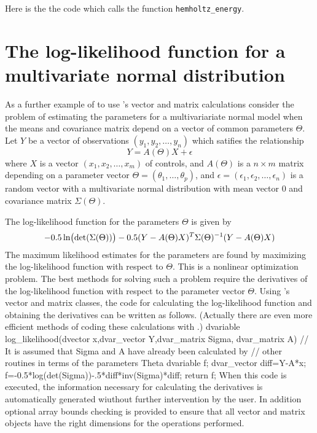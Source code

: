 \documentclass[12pt]{book}
\begin{document}
\goodbreak
Here is the the code which calls the function {\tt hemholtz\_energy}. 
\bigskip
{}

\section{The log-likelihood function for a multivariate normal distribution}
As a further example of to use \AD's vector and matrix
calculations consider the problem of estimating
the parameters for a multivariariate normal model
when the means and covariance matrix depend on a vector
of common parameters $\Theta$.
Let $Y$ be a vector of observations $(y_1, y_2,\ldots,y_n)$
which satifies the relationship
$$ Y = A(\Theta)X + \epsilon $$
where 
$X$ is a vector $(x_1, x_2,\ldots,x_m)$ of controls,
and $A(\Theta)$ is a $n\times m$ matrix depending on a 
parameter vector $\Theta=(\theta_1,\ldots,\theta_p)$,
and $\epsilon=(\epsilon_1, \epsilon_2,\ldots,\epsilon_n)$ 
is a random vector with a multivariate
normal distribution with mean vector $0$ and
covariance matrix $\Sigma(\Theta)$.

The log-likelihood function for the parameters $\Theta$
is given by
$$-0.5\ln\big(\hbox{\rm det}(\Sigma(\Theta))\big)-
   0.5(Y-A(\Theta)X)^T\Sigma(\Theta)^{-1}(Y-A(\Theta)X)$$
The maximum likelihood estimates for the parameters
are found by maximizing the
log-likelihood function with respect to $\Theta$. 
This is a nonlinear optimization problem. The best methods
for solving such a problem require the derivatives of
the log-likelihood function with respect to the parameter
vector $\Theta$. Using \AD's vector and
matrix classes, the code for calculating the log-likelihood
function and obtaining the derivatives can be written as follows. 
(Actually there are even more efficient methods of
coding these calculations with \AD.)
\bestbreak
{\openup\spread \openup\spread
\beginexample
dvariable log_likelihood(dvector x,dvar_vector Y,dvar_matrix Sigma,
  dvar_matrix A)
 // It is assumed that Sigma and A have already been calculated by
 // other routines in terms of the parameters Theta
{
  dvariable f;
  dvar_vector diff=Y-A*x;
  f=-0.5*log(det(Sigma))-.5*diff*inv(Sigma)*diff;
  return f;
}
\endexample}
When this code is executed, the information necessary for  calculating
the 
derivatives is automatically generated wiuthout further intervention
by the user. In addition optional array bounds checking is provided
to ensure that all vector and matrix objects have the right 
dimensions for the operations performed.
\end{document}

